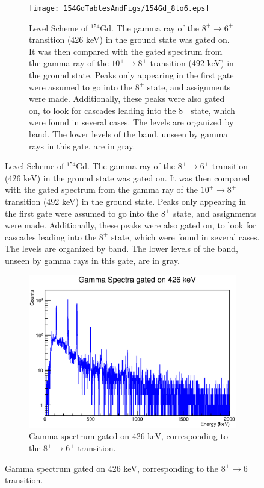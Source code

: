 \begin{figure}[!]
    \centering
    \begin{subfigure}{\textwidth}
    \texttt{[image: 154GdTablesAndFigs/154Gd\_8to6.eps]}
    \caption{\label{fig:154_8to6level}Level Scheme of $^{154}$Gd. The gamma ray of the $8^+\rightarrow6^+$ transition (426 keV) in the ground state was gated on. It was then compared with the gated spectrum from the gamma ray of the $10^+\rightarrow8^+$ transition (492 keV) in the ground state. Peaks only appearing in the first gate were assumed to go into the $8^+$ state, and assignments were made. Additionally, these peaks were also gated on, to look for cascades leading into the $8^+$ state, which were found in several cases. The levels are organized by band. The lower levels of the band, unseen by gamma rays in this gate, are in gray.}
    \end{subfigure}
    \label{fig:154_8to6}
    \end{figure}
\begin{landscape}
    \begin{figure}
    \ContinuedFloat
    \begin{subfigure}{1.4\textwidth}
    \includegraphics[]{154GdTablesAndFigs/426GateSpectrum.eps}
    \caption{Gamma spectrum gated on 426 keV, corresponding to the $8^+\rightarrow6^+$ transition.}
    \label{fig:154_6to4spec}
    \end{subfigure}
\end{figure}
\end{landscape}